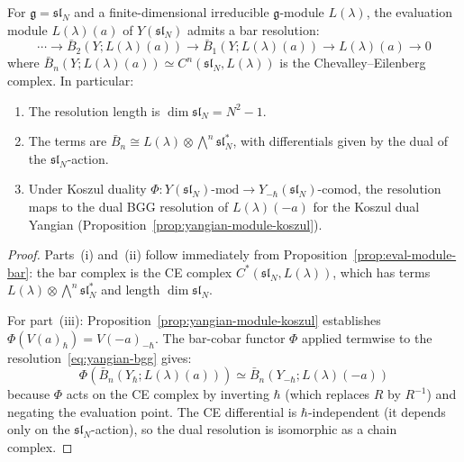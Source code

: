 \begin{theorem}
\label{thm:yangian-bgg}
For $\mathfrak{g} = \mathfrak{sl}_N$ and a finite-dimensional
irreducible $\mathfrak{g}$-module $L(\lambda)$, the evaluation
module $L(\lambda)(a)$ of $Y(\mathfrak{sl}_N)$ admits a
bar resolution:
\begin{equation}\label{eq:yangian-bgg}
\cdots \to \bar{B}_2(Y; L(\lambda)(a))
  \to \bar{B}_1(Y; L(\lambda)(a))
  \to L(\lambda)(a) \to 0
\end{equation}
where $\bar{B}_n(Y; L(\lambda)(a))
\simeq C^n(\mathfrak{sl}_N, L(\lambda))$
is the Chevalley--Eilenberg complex.  In particular:
\begin{enumerate}[label=\textup{(\roman*)}]
\item The resolution length is $\dim \mathfrak{sl}_N
  = N^2 - 1$.
\item The terms are
  $\bar{B}_n \cong L(\lambda) \otimes
  \bigwedge^n \mathfrak{sl}_N^*$,
  with differentials given by the dual of the
  $\mathfrak{sl}_N$-action.
\item Under Koszul duality $\Phi\colon
  Y(\mathfrak{sl}_N)\text{-mod}
  \to Y_{-\hbar}(\mathfrak{sl}_N)\text{-comod}$,
  the resolution maps to the dual BGG resolution
  of $L(\lambda)(-a)$ for the Koszul dual Yangian
  \textup{(}Proposition~\textup{\ref{prop:yangian-module-koszul})}.
\end{enumerate}
\end{theorem}

\begin{proof}
Parts~(i) and~(ii) follow immediately from
Proposition~\ref{prop:eval-module-bar}: the bar complex
is the CE complex $C^*(\mathfrak{sl}_N, L(\lambda))$,
which has terms $L(\lambda) \otimes \bigwedge^n \mathfrak{sl}_N^*$
and length $\dim \mathfrak{sl}_N$.

For part~(iii): Proposition~\ref{prop:yangian-module-koszul}
establishes $\Phi(V(a)_\hbar) = V(-a)_{-\hbar}$.
The bar-cobar functor $\Phi$ applied termwise to the
resolution~\eqref{eq:yangian-bgg} gives:
\[
\Phi(\bar{B}_n(Y_\hbar; L(\lambda)(a)))
\simeq \bar{B}_n(Y_{-\hbar}; L(\lambda)(-a))
\]
because $\Phi$ acts on the CE complex by inverting
$\hbar$ (which replaces $R$ by $R^{-1}$) and negating
the evaluation point.  The CE differential is
$\hbar$-independent (it depends only on the
$\mathfrak{sl}_N$-action), so the dual resolution
is isomorphic as a chain complex.
\end{proof}

